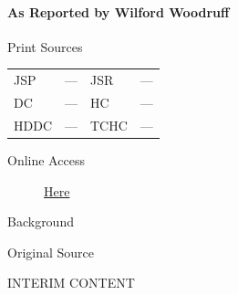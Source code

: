 			\paragraph{As Reported by Wilford Woodruff}
				\label{EMS-1843-JS-22-JAN-1843-WW}
			
				\begin{description}
					\item[Print Sources]
				\end{description}

					\begin{tabular}{p{0.5in}p{1in}p{0.5in}p{1in}}
					JSP	 	& ---		& JSR 		& --- \\
					DC	 	& ---		& HC 		& --- \\
					HDDC 	& ---		& TCHC 		& --- \\
					\end{tabular}
				
				\begin{description}
					\item[Online Access] \href{https://www.josephsmithpapers.org/paper-summary/discourse-22-january-1843-as-reported-by-wilford-woodruff/1}{Here}
				\end{description}
				
				\begin{description}
					\item[Background]
				\end{description}
				
				
				\begin{description}
					\item[Original Source]
				\end{description}
				
					INTERIM CONTENT
				
				
